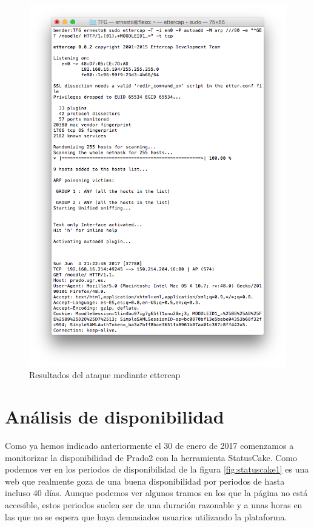 \begin{figure}[H]
\centering
\includegraphics[width=1.0\textwidth]{../screenshots/ettercap}
\caption{Resultados del ataque mediante ettercap}
\label{fig:ettercap}
\end{figure}



\section{Análisis de disponibilidad}

Como ya hemos indicado anteriormente el 30 de enero de 2017 comenzamos a monitorizar la disponibilidad de Prado2 con la herramienta StatusCake. Como podemos ver en los periodos de disponibilidad de la figura \ref{fig:statuscake1} es una web que realmente goza de una buena disponibilidad por periodos de hasta incluso 40 días. Aunque podemos ver algunos tramos en los que la página no está accesible, estos periodos suelen ser de una duración razonable y a unas horas en las que no se espera que haya demasiados usuarios utilizando la plataforma.

